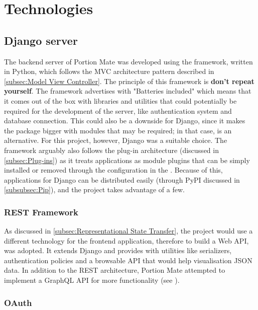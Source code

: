 \documentclass[../main.tex]{subfiles}
\begin{document}
\section{Technologies}

\subsection{Django server}

The backend server of Portion Mate was developed using the  framework, written in Python, which follows the MVC architecture pattern \cite{FAQGeneralDjango, djangoMVC} described in \ref{subsec:Model View Controller}. The principle of this framework is \textbf{don't repeat yourself}. The framework advertises with "Batteries included" which means that it comes out of the box with libraries and utilities that could potentially be required for the development of the server, like authentication system and database connection. This could also be a downside for Django, since it makes the package bigger with modules that may be required; in that case,  is an alternative. For this project, however, Django was a suitable choice. The framework arguably also follows the plug-in architecture (discussed in \ref{subsec:Plug-ins}) as it treats applications as module plugins that can be simply installed or removed through the configuration in the . Because of this, applications for Django can be distributed easily (through PyPI discussed in \ref{subsubsec:Pip}), and the project takes advantage of a few.

\subsubsection{REST Framework}

As discussed in \ref{subsec:Representational State Transfer}, the project would use a different technology for the frontend application, therefore to build a Web API,  was adopted. It extends Django and provides with utilities like serializers, authentication policies and a browsable API that would help visualisation JSON data. In addition to the REST architecture, Portion Mate attempted to implement a GraphQL API for more functionality (see ).

\subsubsection{OAuth}
\end{document}

